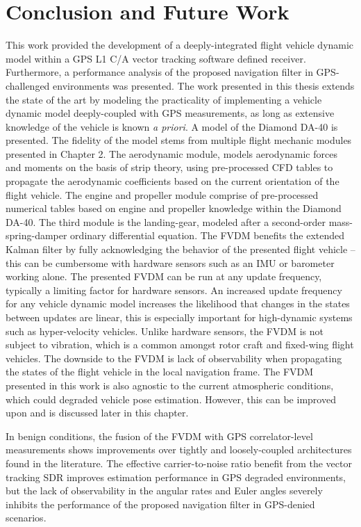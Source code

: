 \chapter{Conclusion and Future Work}
This work provided the development of a deeply-integrated flight vehicle dynamic model within a GPS L1 C/A vector tracking software defined receiver. Furthermore, a performance analysis of the proposed navigation filter in GPS-challenged environments was presented. The work presented in this thesis extends the state of the art by modeling the practicality of implementing a vehicle dynamic model deeply-coupled with GPS measurements, as long as extensive knowledge of the vehicle is known \textit{a priori}. A model of the Diamond DA-40 is presented. The fidelity of the model stems from multiple flight mechanic modules presented in Chapter 2. The aerodynamic module, models aerodynamic forces and moments on the basis of strip theory, using pre-processed CFD tables to propagate the aerodynamic coefficients based on the current orientation of the flight vehicle. The engine and propeller module comprise of pre-processed numerical tables based on engine and propeller knowledge within the Diamond DA-40. The third module is the landing-gear, modeled after a second-order mass-spring-damper ordinary differential equation. The FVDM benefits the extended Kalman filter by fully acknowledging the behavior of the presented flight vehicle {--} this can be cumbersome with hardware sensors such as an IMU or barometer working alone. The presented FVDM can be run at any update frequency, typically a limiting factor for hardware sensors. An increased update frequency for any vehicle dynamic model increases the likelihood that changes in the states between updates are linear, this is especially important for high-dynamic systems such as hyper-velocity vehicles. Unlike hardware sensors, the FVDM is not subject to vibration, which is a common amongst rotor craft and fixed-wing flight vehicles. The downside to the FVDM is lack of observability when propagating the states of the flight vehicle in the local navigation frame. The FVDM presented in this work is also agnostic to the current atmospheric conditions, which could degraded vehicle pose estimation. However, this can be improved upon and is discussed later in this chapter.

In benign conditions, the fusion of the FVDM with GPS correlator-level measurements shows improvements over tightly and loosely-coupled architectures found in the literature. The effective carrier-to-noise ratio benefit from the vector tracking SDR improves estimation performance in GPS degraded environments, but the lack of observability in the angular rates and Euler angles severely inhibits the performance of the proposed navigation filter in GPS-denied scenarios.

